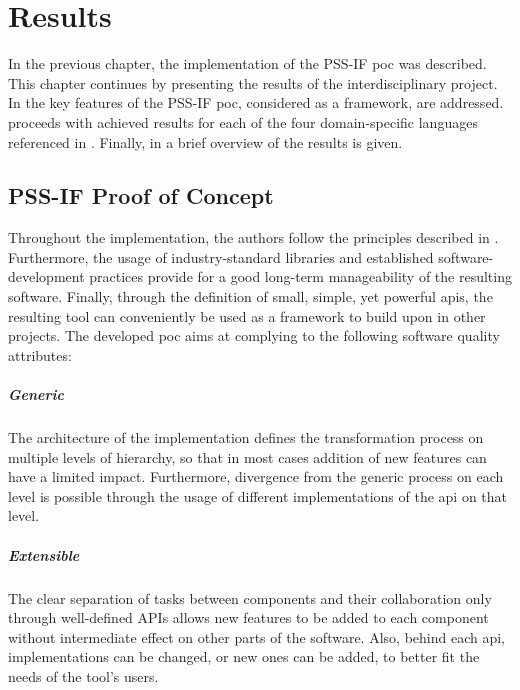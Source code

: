 \chapter{Results}
\label{chap:results}

In the previous chapter, the implementation of the PSS-IF \gls{poc} was described. This chapter continues by presenting the results of the interdisciplinary project. In  the key features of the PSS-IF \gls{poc}, considered as a framework, are addressed.  proceeds with achieved results for each of the four domain-specific languages referenced in . Finally, in  a brief overview of the results is given.

\section{PSS-IF Proof of Concept}
\label{sec:results:framework}

Throughout the implementation, the authors follow the principles described in . Furthermore, the usage of industry-standard libraries and established software-development practices provide for a good long-term manageability of the resulting software. Finally, through the definition of small, simple, yet powerful \glspl{api}, the resulting tool can conveniently be used as a framework to build upon in other projects. The developed \gls{poc} aims at complying to the following software quality attributes:

\paragraph{Generic} The architecture of the implementation defines the transformation process on multiple levels of hierarchy, so that in most cases addition of new features can have a limited impact. Furthermore, divergence from the generic process on each level is possible through the usage of different implementations of the \gls{api} on that level.

\paragraph{Extensible} The clear separation of tasks between components and their collaboration only through well-defined APIs allows new features to be added to each component without intermediate effect on other parts of the software. Also, behind each \gls{api}, implementations can be changed, or new ones can be added, to better fit the needs of the tool's users.

